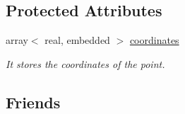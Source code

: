 \subsection*{Protected Attributes}
\begin{DoxyCompactItemize}
\item 
array$<$ real, embedded $>$ \hyperlink{class_point_a24b16f288c9f98da13e4719b6ed462e6}{coordinates}\hypertarget{class_point_a24b16f288c9f98da13e4719b6ed462e6}{}\label{class_point_a24b16f288c9f98da13e4719b6ed462e6}

\begin{DoxyCompactList}\small\item\em It stores the coordinates of the point. \end{DoxyCompactList}\end{DoxyCompactItemize}
\subsection*{Friends}
